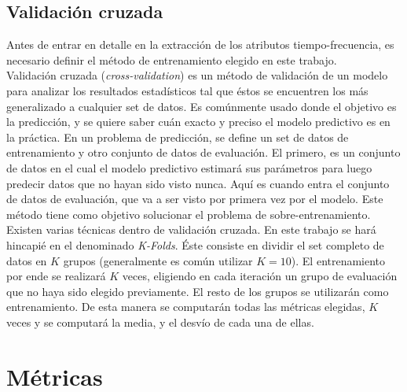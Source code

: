 \subsection*{Validación cruzada} \label{subsec:cross-validation}

\indent Antes de entrar en detalle en la extracción de los atributos tiempo-frecuencia, es necesario definir el
método de entrenamiento elegido en este trabajo. \\
\indent Validación cruzada (\textit{cross-validation}) es un método de validación de un modelo para analizar los
resultados estadísticos tal que éstos se encuentren los más generalizado a cualquier set de datos.
Es comúnmente usado donde el objetivo es la predicción, y se quiere saber cuán exacto y preciso el modelo predictivo
es en la práctica.
En un problema de predicción, se define un set de datos de entrenamiento y otro conjunto de datos de
evaluación. El primero, es un conjunto de datos en el cual el modelo predictivo estimará sus parámetros para luego
predecir datos que no hayan sido visto nunca.
Aquí es cuando entra el conjunto de datos de evaluación, que va a ser visto por primera vez por el modelo. Este
método tiene como objetivo solucionar el problema de sobre-entrenamiento. \\
\indent Existen varias técnicas dentro de validación cruzada. En este trabajo se hará hincapié en el denominado
\textit{K-Folds}.
Éste consiste en dividir el set completo de datos en $K$ grupos (generalmente es común utilizar $K = 10$).
El entrenamiento por ende se realizará $K$ veces, eligiendo en cada iteración un grupo de evaluación que no haya sido
elegido previamente. El resto de los grupos se utilizarán como entrenamiento.
De esta manera se computarán todas las métricas elegidas, $K$ veces y se computará la media, y el desvío de cada una
de ellas.

\section{Métricas} \label{sec:metrics}

